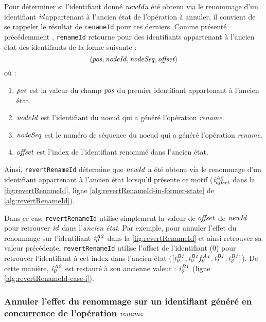 Pour déterminer si l'identifiant donné $\mathit{newId}$\footnotemark a été obtenu via le renommage d'un identifiant $\mathit{id}$\footnotemark[\value{footnote}] appartenant à l'ancien état de l'opération à annuler, il convient de se rappeler le résultat de \texttt{renameId} pour ces derniers.
Comme présenté précédemment , \texttt{renameId} retourne pour des identifiants appartenant à l'ancien état des identifiants de la forme suivante :
\[ \langle \mathit{pos},\mathit{nodeId},\mathit{nodeSeq},\mathit{offset} \rangle \]
où :
\begin{enumerate}
    \item $\mathit{pos}$ est la valeur du champ $\mathit{pos}$ du premier identifiant appartenant à l'ancien état.
    \item $\mathit{nodeId}$ est l'identifiant du noeud qui a généré l'opération \emph{rename}.
    \item $\mathit{nodeSeq}$ est le numéro de séquence du noeud qui a généré l'opération \emph{rename}.
    \item $\mathit{offset}$ est l'index de l'identifiant renommé dans l'ancien état.
\end{enumerate}
Ainsi, \texttt{revertRenameId} détermine que $\mathit{newId}$ a été obtenu via le renommage d'un identifiant appartenant à l'ancien état lorsqu'il présente ce motif ($\mathit{i}^{\mathit{A2}}_{\mathit{offset}}$ dans la \autoref{fig:revertRenameId}, ligne \ref{alg:revertRenameId-in-former-state} de \autoref{alg:revertRenameId}).

Dans ce cas, \texttt{revertRenameId} utilise simplement la valeur de $\mathit{offset}$ de $\mathit{newId}$ pour retrouver $\mathit{id}$ dans l'\emph{ancien état}.
Par exemple, pour annuler l'effet du renommage sur l'identifiant $\mathit{i}^{\mathit{A2}}_{\mathit{0}}$ dans la \autoref{fig:revertRenameId} et ainsi retrouver sa valeur précédente, \texttt{revertRenameId} utilise l'offset de l'identifiant (0) pour retrouver l'identifiant à cet index dans l'ancien état ($[\mathit{i}^{\mathit{B1}}_{\mathit{0}},\mathit{i}^{\mathit{B1}}_{\mathit{0}}\mathit{f}^{\mathit{A1}}_{\mathit{0}},\mathit{i}^{\mathit{B1}}_{\mathit{1}},\mathit{i}^{\mathit{B1}}_{\mathit{2}}]$).
De cette manière, $\mathit{i}^{\mathit{A2}}_{\mathit{0}}$ est restauré à son ancienne valeur : $\mathit{i}^{\mathit{B1}}_{\mathit{0}}$ (ligne \ref{alg:revertRenameId-case-i}).

\subsubsection{Annuler l'effet du renommage sur un identifiant généré en concurrence de l'opération $\mathit{rename}$}

